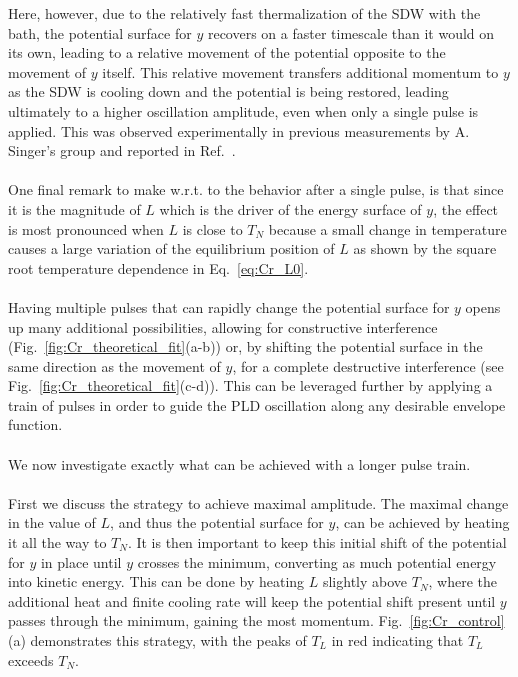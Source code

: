 Here, however, due to the relatively fast thermalization of the SDW with the bath, the potential surface for $y$ recovers on a faster timescale than it would on its own, leading to a relative movement of the potential opposite to the movement of $y$ itself.
This relative movement transfers additional momentum to $y$ as the SDW is cooling down and the potential is being restored, leading ultimately to a higher oscillation amplitude, even when only a single pulse is applied.
This was observed experimentally in previous measurements by A. Singer's group and reported in Ref.~\cite{Singer2015prl}. 
\\\\
One final remark to make w.r.t. to the behavior after a single pulse, is that since it is the magnitude of $L$ which is the driver of the energy surface of $y$, the effect is most pronounced when $L$ is close to $T_N$ because a small change in temperature causes a large variation of the equilibrium position of $L$ as shown by the square root temperature dependence in Eq.~\eqref{eq:Cr_L0}.    
\\\\
Having multiple pulses that can rapidly change the potential surface for $y$ opens up many additional possibilities, allowing for constructive interference (Fig.~\ref{fig:Cr_theoretical_fit}(a-b)) or, by shifting the potential surface in the same direction as the movement of $y$, for a complete destructive interference (see Fig.~\ref{fig:Cr_theoretical_fit}(c-d)).
This can be leveraged further by applying a train of pulses in order to guide the PLD oscillation along any desirable envelope function.
\\\\
We now investigate exactly what can be achieved with a longer pulse train.
\\\\
First we discuss the strategy to achieve maximal amplitude.
The maximal change in the value of $L$, and thus the potential surface for $y$, can be achieved by heating it all the way to $T_N$.
It is then important to keep this initial shift of the potential for $y$ in place until $y$ crosses the minimum, converting as much potential energy into kinetic energy.
This can be done by heating $L$ slightly above $T_N$, where the additional heat and finite cooling rate will keep the potential shift present until $y$ passes through the minimum, gaining the most momentum.
Fig.~\ref{fig:Cr_control}(a) demonstrates this strategy, with the peaks of $T_L$ in red indicating that $T_L$ exceeds $T_N$.
